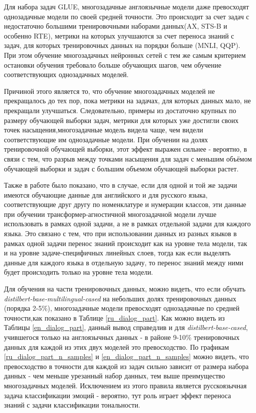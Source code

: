 Для набора задач GLUE, многозадачные англоязычные модели даже превосходят однозадачные модели по своей средней точности. Это происходит за счет задач с недостаточно большими тренировочными наборами данных(AX, STS-B и особенно RTE), метрики на которых улучшаются за счет переноса знаний с задач, для которых тренировочных данных на порядки больше (MNLI, QQP).
При этом обучение многозадачных нейронных сетей с тем же самым критерием остановки обучения требовало больше обучающих шагов, чем обучение соответствующих однозадачных моделей.

Причиной этого является то, что обучение многозадачных моделей не прекращалось до тех пор, пока метрики на задачах, для которых данных мало, не прекращали улучшаться.
Следовательно, примеры из достаточно крупных по размеру обучающей выборки задач, метрики для которых уже достигли своих точек насыщения,многозадачные модель видела чаще, чем видели соответствующие им однозадачные модели. При обучении на долях тренировочной обучающей выборки, этот эффект выражен сильнее - вероятно, в связи с тем, что разрыв между точками насыщения для задач с меньшим объёмом обучающей выборки и задач с большим объемом обучающей выборки растет.

Также в работе было показано, что в случае, если для одной и той же задачи имеются обучающие данные для английского и для русского языка, соответствующие друг другу по номенклатуре и нумерации классов, эти данные при обучении трансформер-агностичной многозадачной модели лучше использовать в рамках одной задачи, а не в рамках отдельной задачи для каждого языка. Это связано с тем, что при использовании данных из разных языков в рамках одной задачи перенос знаний происходит как на уровне тела модели, так и на уровне задаче-специфичных линейных слоев, тогда как если выделять данные для каждого языка в отдельную задачу, то перенос знаний между ними будет происходить только на уровне тела модели.

Для обучения на части тренировочных данных, можно видеть, что если обучать \textit{distilbert-base-multilingual-cased} на небольших долях тренировочных данных (порядка 2-5\%), многозадачные модели превосходят однозадачные по средней точности,как показано в Таблице \ref{ru_dialog_part}. Как можно видеть из Таблицы \ref{en_dialog_part}, данный вывод справедлив и для \textit{distilbert-base-cased}, учившегося только на англоязычных данных - в районе 9-10\% тренировочных данных для каждой из этих двух моделей это превосходство. По графикам \ref{ru_dialog_part_n_samples} и \ref{en_dialog_part_n_samples} можно видеть, что превосходство в точности для каждой из задач сильно зависит от размера набора данных - чем меньше урезанный набор данных, тем выше преимущество многозадачных моделей. Исключением из этого правила является русскоязычная задача классификации эмоций - вероятно, тут роль играет эффект переноса знаний с задачи классификации тональности.

